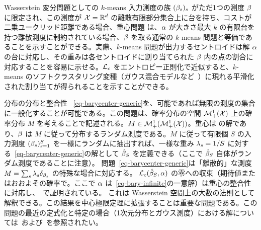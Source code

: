 \begin{rem2}{Wasserstein 変分問題としての $k$-means}\label{rem-bary-kmeans}
入力測度の族 $(\beta_s)_s$ がただ1つの測度 $\beta$ に限定され、この測度が $\mathcal{X}=\mathbb{R}^{d}$ の離散有限部分集合上に台を持ち、コストが二乗ユークリッド距離である場合、重心問題
は、$\alpha$ が大きさ最大 $k$ の有限台を持つ離散測度に制約されている場合、$\beta$ を取る通常の $k$-means 問題と等価であることを示すことができる。実際、$k$-means 問題が出力するセントロイドは解 $\alpha$ の台に対応し、その重みは各セントロイドに割り当てられた $\beta$ 内の点の割合に対応することを容易に示せる。$\mathcal{L}_{c}$ をエントロピー正則化で近似すると、$k$-means のソフトクラスタリング変種（ガウス混合モデルなど~\citep{dessein2017parameter}）に現れる平滑化された割り当てが得られることを示すことができる。
\end{rem2}

\begin{rem2}{分布の分布と整合性}
	~\eqref{eq-barycenter-generic}を、可能であれば無限の測度の集合に一般化することが可能である。この問題は、確率分布の空間 $\mathcal{M}_+^1(\mathcal{X})$ 上の確率分布 $M$ を考えることで記述される。\ie $M \in \mathcal{M}_+^1(\mathcal{M}_+^1(\mathcal{X}))$。重心は
	の解であり、$\beta$ は $M$ に従って分布するランダム測度である。$M$ に従って有限個 $S$ の入力測度 $(\beta_s)_{s=1}^S$ を一様にランダムに抽出すれば、一様な重み $\lambda_s=1/S$ に対する~\eqref{eq-barycenter-generic}の解として $\hat {\beta}_S$ を定義できる（ここで $\hat {\beta}_S$ 自体がランダム測度であることに注意）。
	問題~\eqref{eq-barycenter-generic}は「離散的」な測度 $M=\sum_s \lambda_s \delta_{\beta_s}$ の特殊な場合に対応する。
	$\mathcal{L}_{c}(\hat{\beta}_S,\alpha)$ の零への収束（期待値またはおおよその確率で。ここで $\alpha$ は~\eqref{eq-bary-infinite}の一意解）は重心の整合性に対応し、~\citep{BigotBarycenter,leGouic2016existence,bigot2012characterization}で証明されている。
	これは Wasserstein 空間上の大数の法則として解釈できる。この結果を中心極限定理に拡張することは重要な問題である。この問題の最近の定式化と特定の場合（1次元分布とガウス測度）における解については~\citep{panaretos2016amplitude}および~\citep{agueh2017vers}を参照されたい。
\end{rem2}


